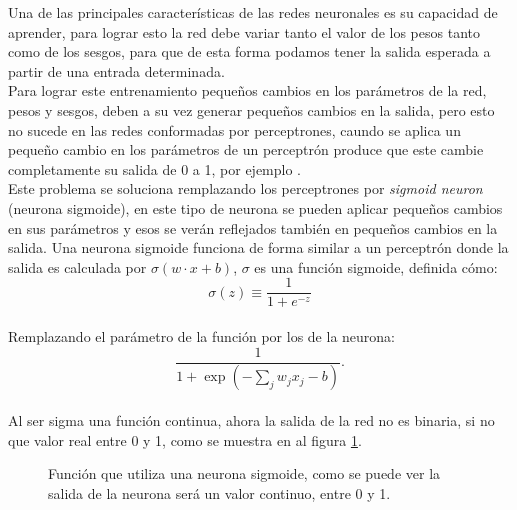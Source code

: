 \documentclass{iccmemoria}
\begin{document}
Una de las principales características de las redes neuronales es su capacidad de aprender, para lograr esto la red debe variar tanto el valor de los pesos tanto como de los sesgos, para que de esta forma podamos tener la salida esperada a partir de una entrada determinada.\\

Para lograr este entrenamiento pequeños cambios en los parámetros de la red, pesos y sesgos, deben a su vez generar pequeños cambios en la salida, pero esto no sucede en las redes conformadas por perceptrones, caundo se aplica un pequeño cambio en los parámetros de un perceptrón produce que este cambie completamente su salida de 0 a 1, por ejemplo \cite{neuralNet}.\\

Este problema se soluciona remplazando los perceptrones por \emph{sigmoid neuron} (neurona sigmoide), en este tipo de neurona se pueden aplicar pequeños cambios en sus parámetros y esos se verán reflejados también en pequeños cambios en la salida. Una neurona sigmoide funciona de forma similar a un perceptrón donde la salida es calculada por $ \sigma(w \cdot x + b)$, $\sigma$ es una función sigmoide, definida cómo:\\

\begin{equation}
	\sigma(z) \equiv \frac{1}{1+e^{-z}}
\end{equation}\\

Remplazando el parámetro de la función por los de la neurona:\\

\begin{equation} 
  \frac{1}{1+\exp(-\sum_j w_j x_j-b)}.
\end{equation}\\

Al ser sigma una función continua, ahora la salida de la red no es binaria, si no que valor real entre 0 y 1, como se muestra en al figura \ref{fig:sigmoid}.\\

\begin{figure}[H]
  \centering
  \begin{small}
  
  \end{small}
  \caption[Función sigmoide.]{Función que utiliza una neurona sigmoide, como se puede ver la salida de la neurona será un valor continuo, entre 0 y 1.}
  \label{fig:sigmoid}
\end{figure}
\end{document}
